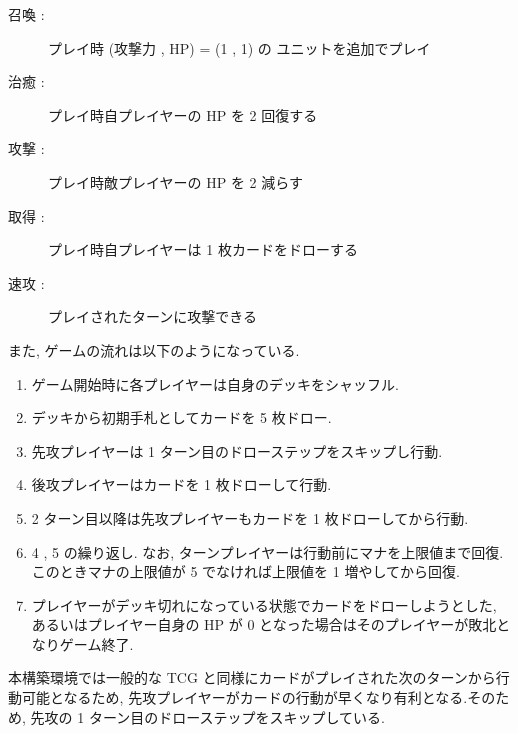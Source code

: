 \documentclass[twocolumn]{jarticle}     %
\begin{document}
\begin{description}
   \vspace{-0.15cm}
   \setlength{\itemsep}{0cm}
   \small
  \item[召喚 :]  プレイ時 (攻撃力 , HP) = (1 , 1) の
  ユニットを追加でプレイ
  \item[治癒 :]  プレイ時自プレイヤーの HP を 2 回復する
  \item[攻撃 :]  プレイ時敵プレイヤーの HP を 2 減らす
  \item[取得 :]  プレイ時自プレイヤーは 1 枚カードをドローする
  \item[速攻 :]  プレイされたターンに攻撃できる
\end{description}
\vspace{-0.3cm}
また, ゲームの流れは以下のようになっている.
\begin{enumerate}
  \small
  \vspace{-0.15cm}
  \setlength{\itemsep}{0cm} %
  \item ゲーム開始時に各プレイヤーは自身のデッキをシャッフル.
  \item デッキから初期手札としてカードを 5 枚ドロー. 
  \item 先攻プレイヤーは 1 ターン目のドローステップをスキップし行動.
  \item 後攻プレイヤーはカードを 1 枚ドローして行動.
  \item 2 ターン目以降は先攻プレイヤーもカードを 1 枚ドローしてから行動. 
  \item 4 , 5 の繰り返し. なお, ターンプレイヤーは行動前にマナを上限値まで回復. このときマナの上限値が 5 でなければ上限値を 1 増やしてから回復.
  \item プレイヤーがデッキ切れになっている状態でカードをドローしようとした, あるいはプレイヤー自身の HP が 0 となった場合はそのプレイヤーが敗北となりゲーム終了.
\end{enumerate}
\vspace{-0.15cm}
\par
本構築環境では一般的な TCG と同様にカードがプレイされた次のターンから行動可能となるため, 先攻プレイヤーがカードの行動が早くなり有利となる.そのため, 先攻の 1 ターン目のドローステップをスキップしている. 
\end{document}
